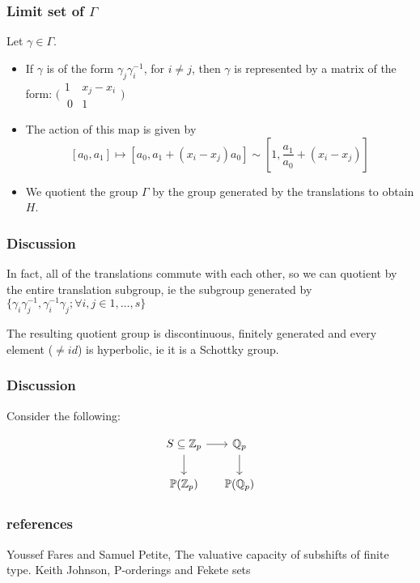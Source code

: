 \documentclass{beamer}
\theoremstyle{definition}
\begin{document}
\begin{frame}
\frametitle{Limit set of $\Gamma$}
Let $\gamma \in \Gamma$.
\begin{itemize}
\item If $\gamma$ is of the form $\gamma_j \gamma_i^{-1}$, for $i \neq j$, then $\gamma$  is represented by a matrix of the form:  $\bigl( \begin{smallmatrix}1 & x_j-x_i\\\ 0 & 1 \end{smallmatrix}\bigr)$
\item The action of this map is given by \[[a_0,a_1] \mapsto [a_0, a_1 + (x_i-x_j)a_0] \sim [1, \frac{a_1}{a_0} + (x_i-x_j) ]\]
\pause
\item We quotient the group $\Gamma$ by the group generated by the translations to obtain $H$.
\end{itemize}
\end{frame}



\begin{frame}
\frametitle{Discussion}
In fact, all of the translations commute with each other, so we can quotient by the entire translation subgroup, ie the subgroup generated by $\{\gamma_i \gamma_j^{-1}, \gamma_i ^{-1} \gamma_j; \forall i,j \in 1,\ldots,s\}$ 
\parskip=20pt


The resulting quotient group is discontinuous, finitely generated and every element ($\neq id$)  is hyperbolic, ie it is a Schottky group. 

\end{frame}


\begin{frame}
\frametitle{Discussion}
Consider the following:

\[
        \begin{tikzcd}[ampersand replacement=\&, column sep=small]
            S \subseteq \mathbb{Z}_p \arrow[r] \ar[d] \&  \mathbb{Q}_p  \ar[d] \\
            \mathbb{P}(\mathbb{Z}_p)  \&   \mathbb{P}(\mathbb{Q}_p)
        \end{tikzcd}
    \]

\end{frame}



\begin{frame}
\frametitle{references}
\begin{thebibliography}{1}
 Youssef Fares and Samuel Petite, The valuative capacity of subshifts of finite type.
 Keith Johnson, P-orderings and Fekete sets
\end{thebibliography}
\end{frame}
\end{document}
